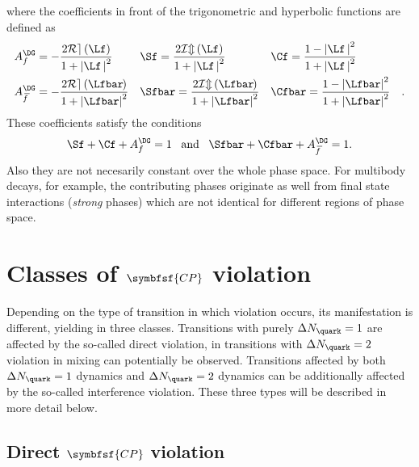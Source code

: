 where the coefficients in front of the trigonometric and hyperbolic functions are defined as
\begin{align}
&A_f^{\DG}=-\frac{2\mathcal{Re}\left(\Lf\right)}{1+\left|\Lf\,\right|^2}&
&\Sf=\frac{2\mathcal{Im}\left(\Lf\right)}{1+\left|\Lf\,\right|^2}&
&\Cf=\frac{1-\left|\Lf\,\right|^2}{1+\left|\Lf\,\right|^2}&\label{eq:cpcoeff}\\
&A_{\kern 1.5pt\overline{\kern -1.5pt f\kern 1.5pt}}^{\DG}=-\frac{2\mathcal{Re}\left(\Lfbar\kern -0.1em\right)}{1+\left|\Lfbar\right|^2}&
&\Sfbar=\frac{2\mathcal{Im}\left(\Lfbar\kern -0.1em\right)}{1+\left|\Lfbar\right|^2}&
&\Cfbar=\frac{1-\left|\Lfbar\right|^2}{1+\left|\Lfbar\right|^2}&\label{eq:cpcoeffbar}.
\end{align}
These coefficients satisfy the conditions
\begin{equation}
\Sf+\Cf+A_f^{\DG}=1\,\,\,\,\,\text{and}\,\,\,\,\,\Sfbar+\Cfbar+A_{\kern 1.5pt\overline{\kern -1.5pt f\kern 1.5pt}}^{\DG}=1.
\end{equation}
Also they are not necesarily constant over the whole phase space.
For multibody decays, for example, the contributing phases originate as well from final state interactions (\ie \emph{strong} phases) which are not identical for different regions of phase space.

\section[head={Classes of \CP violation},tocentry={Classes of \CP violation}]{Classes of $\symbfsf{C{}P}$ violation}
\label{sec:CPVClasses}

Depending on the type of transition in which \CP violation occurs, its manifestation is different, yielding in three classes.
Transitions with purely $\Delta N_\quark=1$ are affected by the so-called direct \CP violation, in transitions with $\Delta N_\quark=2$ \CP violation in mixing can potentially be observed.
Transitions affected by both $\Delta N_\quark=1$ dynamics and $\Delta N_\quark=2$ dynamics can be additionally affected by the so-called interference \CP violation.
These three types will be described in more detail below.


\subsection[head={Direct \CP violation},tocentry={Direct \CP violation}]{Direct $\symbfsf{C{}P}$ violation}
\label{sec:DirectCPV}

